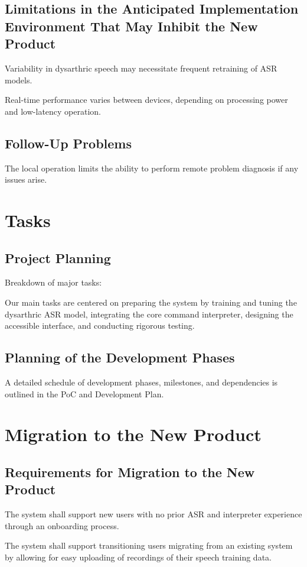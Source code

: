 \documentclass[12pt]{article}
\begin{document}
\subsection{Limitations in the Anticipated Implementation Environment That May
Inhibit the New Product}
Variability in dysarthric speech may necessitate frequent retraining of ASR models.

Real-time performance varies between devices, depending on processing power and low-latency operation.
\subsection{Follow-Up Problems}
The local operation limits the ability to perform remote problem diagnosis if any issues arise.


\section{Tasks}
\subsection{Project Planning}
Breakdown of major tasks:

Our main tasks are centered on preparing the system by training and tuning the dysarthric ASR model, integrating the core command interpreter, designing the accessible interface, and conducting rigorous testing.
\subsection{Planning of the Development Phases}
A detailed schedule of development phases, milestones, and dependencies is outlined in the PoC and Development Plan.

\section{Migration to the New Product}
\subsection{Requirements for Migration to the New Product}
The system shall support new users with no prior ASR and interpreter experience through an onboarding process. 

The system shall support transitioning users migrating from an existing system by allowing for easy uploading of recordings of their speech training data.
\end{document}
